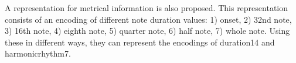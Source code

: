 
A representation for metrical information is also proposed.
This representation consists of an encoding of different
note duration values: 1) onset, 2) 32nd note, 3) 16th note,
4) eighth note, 5) quarter note, 6) half note, 7) whole
note. Using these in different ways, they can represent the
encodings of \gls{duration14} and \gls{harmonicrhythm7}.
